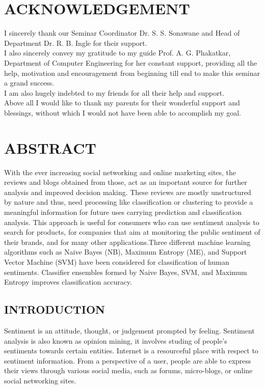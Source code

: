 \documentclass[10pt]{article}
\begin{document}
\section*{ACKNOWLEDGEMENT}
\large{
I sincerely thank our Seminar Coordinator Dr. S. S. Sonawane and Head of Department Dr. R. B. Ingle
for their support.\\
I also sincerely convey my gratitude to my guide Prof. A. G. Phakatkar, Department of Computer Engineering for her constant
support, providing all the help, motivation and encouragement from beginning till end to make this
seminar a grand success.\\
I am also hugely indebted to my friends for all their help and support.\\
Above all I would like to thank my parents for their wonderful support and blessings, without which
I would not have been able to accomplish my goal.

\newpage
\tableofcontents
\newpage
\listoffigures
\newpage
\listoftables


\newpage
\section*{ABSTRACT}
	With the ever increasing social networking and online marketing sites, the reviews and blogs obtained
	from those, act as an important source for further analysis and improved decision making. These reviews
	are mostly unstructured by nature and thus, need processing like classification or clustering to provide a
	meaningful information for future uses carrying prediction and classification analysis.
	This approach is useful for consumers who can use sentiment analysis to
	search for products, for companies that aim at monitoring the public sentiment of their brands, and for many
	other applications.Three different machine
	learning algorithms such as Naive Bayes (NB), Maximum Entropy (ME),
	and Support Vector Machine (SVM) have been considered for classification of human sentiments.
	Classifier ensembles formed by Naive Bayes, SVM, and Maximum Entropy improves classification accuracy.

\newpage
{}
\begin{center}
\section{INTRODUCTION}
\end{center}

\par Sentiment is an attitude, thought, or judgement prompted by feeling. Sentiment analysis 
is also known as opinion mining, it involves studing of people’s sentiments towards 
certain entities. Internet is a resourceful place with respect to sentiment information. From a
perspective of a user, people are able to express their views through various social media,
such as forums, micro-blogs, or online social networking sites.

}
\end{document}
